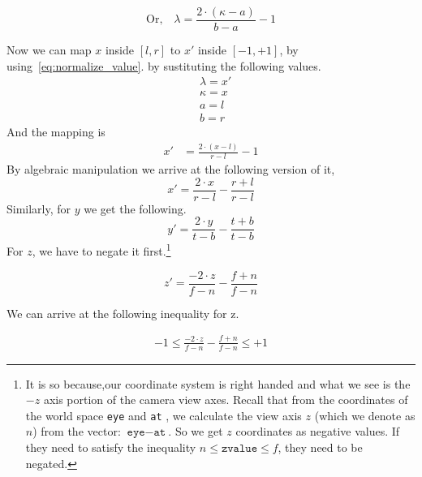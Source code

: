 \begin{equation}
\text{Or,}\quad \lambda = \frac{2 \cdot (\kappa-a)}{b-a} - 1
\label{eq:normalize_value}
\end{equation}



Now we can map $x$ inside $[l,r]$ to $x'$ inside $[-1, +1]$, by using~\eqref{eq:normalize_value}.
by sustituting the following values.
\begin{align*}
&\lambda = x' \\
&\kappa = x \\
&a = l \\
&b = r
\end{align*}
And the mapping is
\begin{align*}
x' &= \frac{2 \cdot (x - l)}{r - l} - 1 
\end{align*}
By algebraic manipulation we arrive at the following version of it,
\begin{equation}
  x' = \frac{2 \cdot x}{r-l} - \frac{r+l}{r-l}
\end{equation}
Similarly, for $y$ we get the following.
\begin{equation}
  y' = \frac{2 \cdot y}{t-b} - \frac{t+b}{t-b}
\end{equation}
For $z$, we have to negate it first.\footnote{It is so because,our coordinate system is right handed and what we see is the $-z$ axis portion of the camera view axes. Recall that from the coordinates of the world space \texttt{eye} and \texttt{at} , we calculate the view axis $z$ (which we denote as $n$) from the vector: $\texttt{eye} - \texttt{at}$. So we get $z$ coordinates as negative values. If they need to satisfy the inequality $n \leq \texttt{zvalue} \leq f$, they need to be negated.}

\begin{equation}
  z' = \frac{-2 \cdot z}{f-n} - \frac{f+n}{f-n}
\end{equation}


We can arrive at the following inequality for z.

\begin{align}
  -1 \leq \frac{-2 \cdot z}{f-n} - \frac{f+n}{f-n} \leq +1
\end{align}

